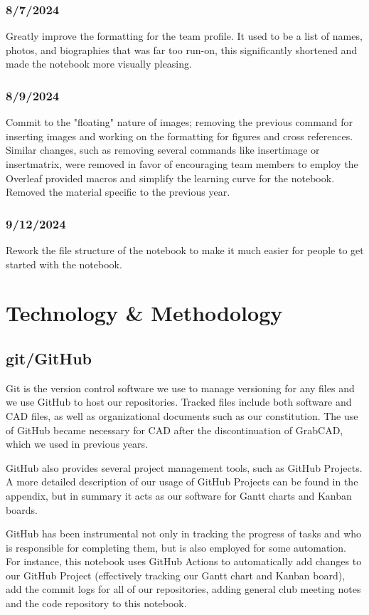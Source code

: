 \subsection{8/7/2024}
Greatly improve the formatting for the team profile. It used to be a list of
names, photos, and biographies that was far too run-on, this significantly shortened and made the notebook more visually pleasing. 
\subsection{8/9/2024}
Commit to the "floating" nature of images; removing the previous command for inserting
images and working on the formatting for figures and cross references. Similar changes,
such as removing several commands like insertimage or insertmatrix, were removed in favor
of encouraging team members to employ the Overleaf provided macros and simplify the
learning curve for the notebook. Removed the material specific to the previous year.
\subsection{9/12/2024}
Rework the file structure of the notebook to make it much easier for people to get started
with the notebook. 

\chapter{Technology \& Methodology}
\section{git/GitHub}
Git is the version control software we use to manage versioning for any files and we use
GitHub to host our repositories. Tracked files include both software and CAD files, as well
as organizational documents such as our constitution. The use of GitHub became necessary
for CAD after the discontinuation of GrabCAD, which we used in previous years.

GitHub also provides several project management tools, such as GitHub Projects. A more detailed description of our usage of GitHub Projects can be found in the appendix,
but in summary it acts as our software for Gantt charts and Kanban boards. 


GitHub has been instrumental not only in tracking the progress of tasks and who is responsible for completing them, but is also employed for some automation. For instance, this notebook uses GitHub Actions to automatically add changes to our GitHub Project (effectively tracking our Gantt chart and Kanban board), add the commit logs for all of our repositories, adding general club meeting notes and the code repository to this notebook.
\newline

